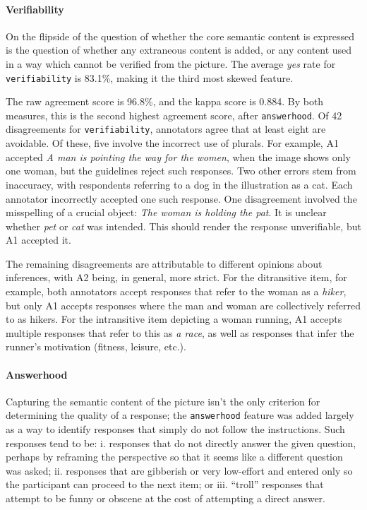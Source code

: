 \documentclass[11pt,a4paper]{article}
\newcommand{\feat}[1]{\texttt{#1}}
\begin{document}
\paragraph{Verifiability} On the flipside of the question of whether the core semantic content is expressed is the question of whether any extraneous content is added, or any content used in a way which cannot be verified from the picture.  The average \textit{yes} rate for \feat{verifiability} is 83.1\%, making it the third most skewed feature.

The raw agreement score is 96.8\%, and the kappa score is 0.884. By both measures, this is the second highest agreement score, after \feat{answerhood}. Of 42 disagreements for \feat{verifiability}, annotators agree that at least eight are avoidable. Of these, five involve the incorrect use of plurals. For example, A1 accepted \textit{A man is pointing the way for the women}, when the image shows only one woman, but the guidelines reject such responses. Two other errors stem from inaccuracy, with respondents referring to a dog in the illustration as a cat. Each annotator incorrectly accepted one such response. One disagreement involved the misspelling of a crucial object: \textit{The woman is holding the pat}. It is unclear whether \textit{pet} or \textit{cat} was intended. This should render the response unverifiable, but A1 accepted it.

The remaining disagreements are attributable to different opinions about inferences, with A2 being, in general, more strict.  For the ditransitive item, for example, both annotators accept responses that refer to the woman as a \textit{hiker}, but only A1 accepts responses where the man and woman are collectively referred to as hikers. For the intransitive item depicting a woman running, A1 accepts multiple responses that refer to this as \textit{a race}, as well as responses that infer the runner's motivation (fitness, leisure, etc.).

\paragraph{Answerhood} Capturing the semantic content of the picture isn't the only criterion for determining the quality of a response; the \feat{answerhood} feature was added largely as a way to identify responses that simply do not follow the instructions. Such responses tend to be: i. responses that do not directly answer the given question, perhaps by reframing the perspective so that it seems like a different question was asked; ii. responses that are gibberish or very low-effort and entered only so the participant can proceed to the next item; or iii. ``troll'' responses that attempt to be funny or obscene at the cost of attempting a direct answer.
\end{document}
